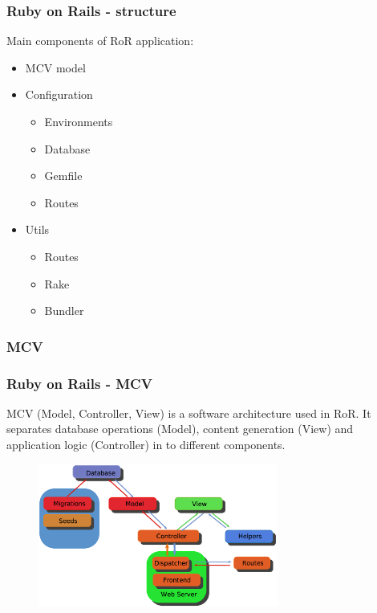 \documentclass{beamer}
\theoremstyle{mystyle}
\begin{document}
\begin{frame}
  \frametitle{Ruby on Rails - structure}
  Main components of RoR application:
  \begin{itemize}
  \item MCV model
  \item Configuration
    \begin{itemize}
      \item Environments
      \item Database
      \item Gemfile
      \item Routes
    \end{itemize}
  \item Utils
    \begin{itemize}
      \item Routes
      \item Rake
      \item Bundler
    \end{itemize}
  \end{itemize}
  
\end{frame}

\subsubsection{MCV}
\begin{frame}
  \frametitle{Ruby on Rails - MCV }
  \begin{definition}
    MCV (Model, Controller, View) is a software architecture used in RoR.
    It separates database operations (Model), content generation (View)
    and application logic (Controller) in to different components.
  \end{definition}
  \begin{figure}[h]
   \centering
      \includegraphics[width = 0.7\textwidth]{./mcv1.eps}
  \end{figure}
  
\end{frame}
\end{document}
